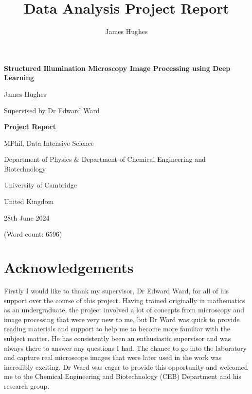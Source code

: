 \documentclass[12pt]{article}
\title{Data Analysis Project Report}
\author{James Hughes}
\begin{document}
\begin{titlepage}
    \begin{center}
        \vspace*{5cm}

        \Huge
        \textbf{Structured Illumination Microscopy Image Processing using Deep Learning}

        \vspace{0.5cm}
        \LARGE

        James Hughes

        Supervised by Dr Edward Ward

        \vspace{2cm}
        \Huge
        \textbf{Project Report}

        \vfill

        MPhil, Data Intensive Science

        \vspace{0.8cm}

        \Large
        Department of Physics \& Department of Chemical Engineering and Biotechnology

        University of Cambridge

        United Kingdom

        28th June 2024

        (Word count: 6596)

    \end{center}
\end{titlepage}


\newpage
\section*{Acknowledgements}

Firstly I would like to thank my supervisor, Dr Edward Ward, for all of his support over the course of this project.
Having trained originally in mathematics as an undergraduate,
the project involved a lot of concepts from microscopy and image processing that were very new to me,
but Dr Ward was quick to provide reading materials and support to help me to become more familiar with the subject matter.
He has consistently been an enthusiastic supervisor and was always there to answer any questions I had.
The chance to go into the laboratory and capture real microscope images that were later used in the work was incredibly exciting.
Dr Ward was eager to provide this opportunity and welcomed me to the Chemical Engineering and Biotechnology (CEB) Department and his research group.
\end{document}
